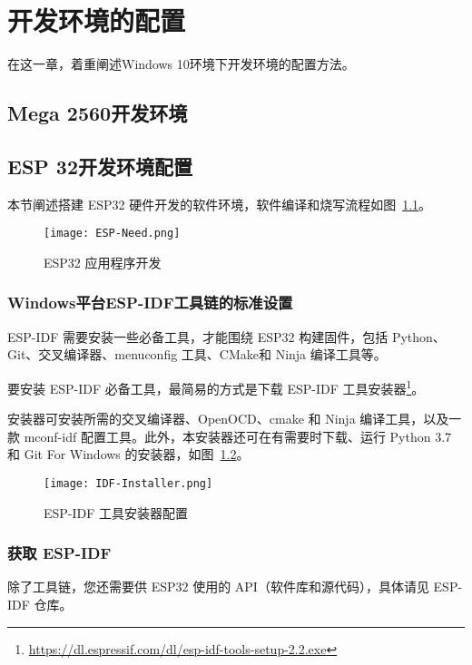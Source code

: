 \chapter{开发环境的配置}
\label{cha:Environment}

在这一章，着重阐述Windows 10环境下开发环境的配置方法。

\section{Mega 2560开发环境}


\section{ESP 32开发环境配置}

本节阐述搭建 ESP32 硬件开发的软件环境，软件编译和烧写流程如图~\ref{fig:ESP-Need}。

\begin{figure}[htbp]
    \centering
    \texttt{[image: ESP-Need.png]}
    \caption{ESP32 应用程序开发}
    \label{fig:ESP-Need}
\end{figure}

\subsection{Windows平台ESP-IDF工具链的标准设置}

ESP-IDF 需要安装一些必备工具，才能围绕 ESP32 构建固件，包括 Python、Git、交叉编译器、menuconfig 工具、CMake和 Ninja 编译工具等。

要安装 ESP-IDF 必备工具，最简易的方式是下载 ESP-IDF 工具安装器\footnote{\url{https://dl.espressif.com/dl/esp-idf-tools-setup-2.2.exe}}。

安装器可安装所需的交叉编译器、OpenOCD、cmake 和 Ninja 编译工具，以及一款 mconf-idf 配置工具。此外，本安装器还可在有需要时下载、运行 Python 3.7 和 Git For Windows 的安装器，如图~\ref{fig:IDF-Installer}。

\begin{figure}[htbp]
    \centering
    \texttt{[image: IDF-Installer.png]}
    \caption{ESP-IDF 工具安装器配置}
    \label{fig:IDF-Installer}
\end{figure}

\subsection{获取 ESP-IDF}

除了工具链，您还需要供 ESP32 使用的 API（软件库和源代码），具体请见 ESP-IDF 仓库。

